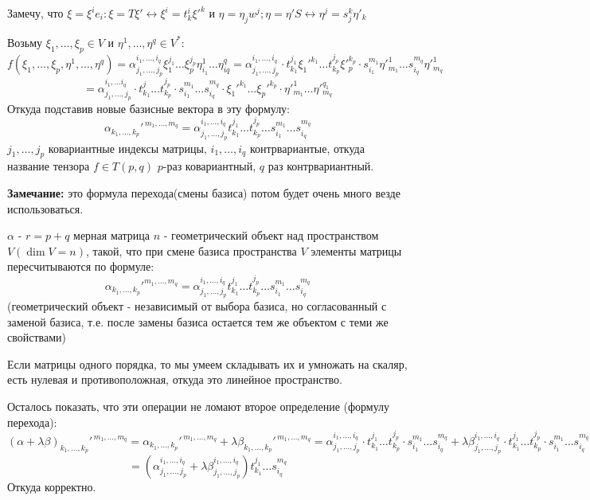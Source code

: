 Замечу, что $\xi =\xi^i e_i: \xi = T \xi' \leftrightarrow \xi^i = t_k^i\xi'^k$
и $\eta = \eta_j w^j; \eta = \eta'S \leftrightarrow \eta^j = s_{j}^k \eta'_k $

Возьму $\xi_1,\ldots,\xi_p \in V$ и $\eta^1,\ldots, \eta^q\in V^*$:
$$f(\xi_1,\ldots,\xi_p,\eta^1,\ldots,\eta^q)=\alpha^{i_1,\ldots,i_q}_{j_1,\ldots, j_p}\xi_1^{j_1}\ldots \xi_{p}^{j_p} \eta_{i_1}^1 \ldots \eta_{iq}^q =\alpha^{i_1,\ldots,i_q}_{j_1,\ldots, j_p} \cdot t_{k_1}^{j_1}\xi_1'^{k_1}\ldots t_{k_p}^{{j_p}}\xi'^{k_p}_p \cdot s_{i_1}^{m_1}\eta'^1_{m_1}\ldots s_{i_q}^{m_q}\eta'^1_{m_q}$$
$$= \alpha^{i_1,\ldots i_q}_{j_1,\ldots, j_p} \cdot t_{k_1}^{j}\ldots t_{k_p}^{j_p}\cdot s_{i_1}^{m_1}\ldots s_{i_q}^{m_q}\cdot \xi_1'^{k_1}\ldots \xi_{p}'^{k_p} \cdot \eta'^{1}_{m_1}\ldots \eta'^{q_1}_{m_q}$$
Откуда подставив новые базисные вектора в эту формулу:
$$\alpha_{k_1,\ldots,k_p}'^{\,m_1,\ldots, m_q} = \alpha_{j_1,\ldots,j_p}^{i_1,\ldots, i_q}t_{k_1}^{j_1}\ldots t_{k_p}^{j_p}\ldots s_{i_1}^{m_1}\ldots s_{i_q}^{m_q}$$
$j_1,\ldots, j_p$ ковариантные индексы матрицы, $i_1,\ldots, i_q$ контрвариантые, откуда название тензора $f\in T(p,q)$ $p$-раз ковариантный, $q$ раз контрвариантный.

\textbf{Замечание:} это формула перехода(смены базиса) потом будет очень много везде использоваться.


 $\alpha$ - $r = p+q$ мерная матрица $n$ - геометрический объект над пространством $V(\dim V =n)$, такой, что при смене базиса пространства $V$ элементы матрицы пересчитываются по формуле:
$$\alpha_{k_1,\ldots,k_p}'^{m_1,\ldots, m_q} = \alpha_{j_1,\ldots,j_p}^{i_1,\ldots, i_q}t_{k_1}^{j_1}\ldots t_{k_p}^{j_p}\ldots s_{i_1}^{m_1}\ldots s_{i_q}^{m_q}$$(геометрический объект - независимый от выбора базиса, но согласованный с заменой базиса, т.е. после замены базиса остается тем же объектом с теми же свойствами)

Если матрицы одного порядка, то мы умеем складывать их и умножать на скаляр, есть нулевая и противоположная, откуда это линейное пространство.  

Осталось показать, что эти операции не ломают второе определение (формулу перехода):
$$(\alpha + \lambda \beta)_{k_1,\ldots,k_p}'^{\,m_1,\ldots,m_q} = \alpha_{k_1,\ldots,k_p}'^{\, m_1,\ldots, m_q} + \lambda \beta_{k_1,\ldots,k_p}'^{\, m_1,\ldots, m_q} = \alpha_{j_1,\ldots,j_p}^{i_1,\ldots,i_q} \cdot t_{k_1}^{j_1} \ldots t_{k_p}^{j_p}\cdot s_{i_1}^{m_1}\ldots s_{i_q}^{m_q} + \lambda\beta_{j_1,\ldots,j_p}^{i_1,\ldots,i_q} \cdot t_{k_1}^{j_1} \ldots t_{k_p}^{j_p}\cdot s_{i_1}^{m_1}\ldots s_{i_q}^{m_q} $$
$$= (\alpha_{j_1,\ldots, j_p}^{i_1,\ldots,i_q} + \lambda \beta_{j_1,\ldots, j_p}^{i_1,\ldots,i_q})t_{k_1}^{j_1}\ldots s_{i_q}^{m_q}$$
Откуда корректно.

